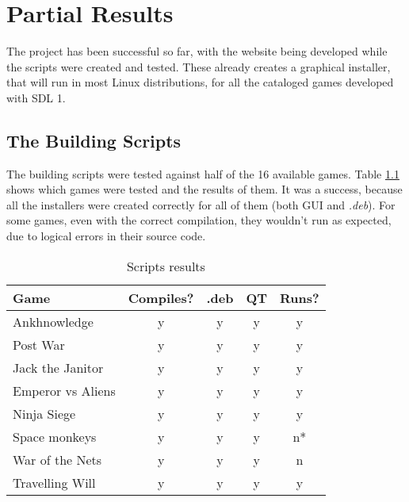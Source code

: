 \chapter[Partial Results]{Partial Results}
\label{sec:results}


The project has been successful so far, with the website being developed while the scripts were created and tested. These already creates a graphical installer, that will run in most Linux distributions, for all the cataloged games developed with SDL 1.

\section{The Building Scripts}
\label{sec:building_scripts}

The building scripts were tested against half of the 16 available games. Table \ref{tab:script_games} shows which games were tested and the results of them. It was a success, because all the installers were created correctly for all of them (both GUI and \textit{.deb}). For some games, even with the correct compilation, they wouldn't run as expected, due to logical errors in their source code.

\begin{table}[h!]
\centering
\caption{Scripts results}
\label{tab:script_games}
\begin{tabular}{lcccc}
\hline
\textbf{Game} & \multicolumn{1}{l}{\textbf{Compiles?}} & \multicolumn{1}{l}{\textbf{.deb}} & \multicolumn{1}{l}{\textbf{QT}} & \multicolumn{1}{l}{\textbf{Runs?}} \\ \hline
Ankhnowledge & y & y & y & y \\
Post War & y & y & y & y \\
Jack the Janitor & y & y & y & y \\
Emperor vs Aliens & y & y & y & y \\
Ninja Siege & y & y & y & y \\
Space monkeys & y & y & y & n* \\
War of the Nets & y & y & y & n \\
Travelling Will & y & y & y & y \\ \hline
\end{tabular}
\end{table}

